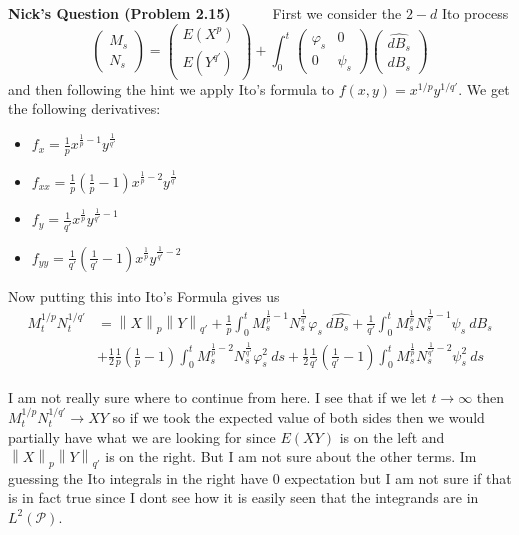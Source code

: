 \documentclass[a4paper,11pt]{article}
\numberwithin{equation}{section}
\theoremstyle{plain}
\theoremstyle{definition}
\newcommand{\Norm}[1]{\left\|  #1   \right\|}
\newcounter{NQ}
\newenvironment{NickQuestion}[1][] %
{\refstepcounter{NQ}
	\begin{mdframed}[backgroundcolor=lightgray]\textbf{Nick's Question \theNQ \: #1~~}~~~\noindent}%
	{\end{mdframed}}
\numberwithin{NQ}{section}
\numberwithin{LQ}{section}
\numberwithin{ZQ}{section}
\begin{document}
\begin{NickQuestion}[(Problem 2.15)]
	First we consider the $2-d$ Ito process
	\[
		\begin{pmatrix}
			M_s
			\\ N_s
		\end{pmatrix}
		=
		\begin{pmatrix}
		E(X^p)
		\\ E(Y^{q'})
		\end{pmatrix}
		+
	\int_0^t {	\begin{pmatrix}
		\varphi_s & 0
		\\0 & \psi_s
		\end{pmatrix}
		\begin{pmatrix}
		\hat{d B_s}
		\\ d B_s
		\end{pmatrix} }
	\]
	and then following the hint we apply Ito's formula to $f(x,y) = x^{1/p}y^{1/q'}$. We get the following derivatives:
	\begin{itemize}
		\item $f_x = \frac{1}{p}x^{\frac{1}{p}-1}y^{\frac{1}{q'}}$
		\item $f_{xx} = \frac{1}{p} \left(\frac{1}{p}-1\right)x^{\frac{1}{p}-2}y^{\frac{1}{q'}}$
		\item $f_y = \frac{1}{q'}x^{\frac{1}{p}}y^{\frac{1}{q'}-1}$
		\item $f_{yy} =\frac{1}{q'} \left(\frac{1}{q'}-1\right)x^{\frac{1}{p}}y^{\frac{1}{q'}-2}$
	\end{itemize}
	Now putting this into Ito's Formula gives us
	\begin{align*}
		M_t^{1/p}N_t^{1/q'}&=\Norm{X}_p\Norm{Y}_{q'} + \frac{1}{p}\int_0^t M_s^{\frac{1}{p}-1}N_s^{\frac{1}{q'}} \varphi_s \: d\hat{B_s}+ \frac{1}{q'}\int_0^t M_s^{\frac{1}{p}}N_s^{\frac{1}{q'}-1}\psi_s \: dB_s
		\\& + \frac{1}{2}\frac{1}{p} \left(\frac{1}{p}-1\right)\int_0^t M_s^{\frac{1}{p}-2}N_s^{\frac{1}{q'}}\varphi_s^2 \: ds + \frac{1}{2}\frac{1}{q'} \left(\frac{1}{q'}-1\right)\int_0^t M_s^{\frac{1}{p}}N_s^{\frac{1}{q'}-2} \psi_s^2 \: ds
	\end{align*}

	I am not really sure where to continue from here. I see that if we let $t \to \infty$ then $M_t^{1/p}N_t^{1/q'} \to XY$ so if we took the expected value of both sides then we would partially have what we are looking for since $E(XY)$ is on the left and $\Norm{X}_p\Norm{Y}_{q'}$ is on the right. But I am not sure about the other terms. Im guessing the Ito integrals in the right have $0$ expectation but I am not sure if that is in fact true since I dont see how it is easily seen that the integrands are in $L^2(\mathcal P)$.


\end{NickQuestion}
\end{document}
